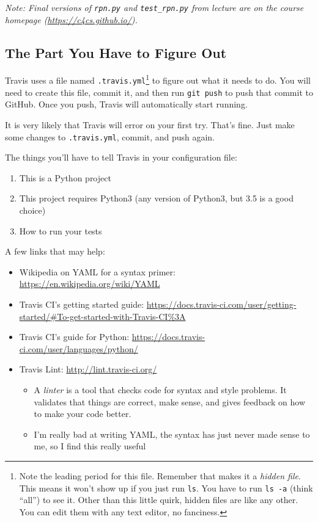 \documentclass{article}
\begin{document}
\emph{Note: Final versions of \texttt{rpn.py} and \texttt{test\_rpn.py} from
  lecture are on the course homepage (\url{https://c4cs.github.io/}).}

\newpage

\subsection{The Part You Have to Figure Out}

Travis uses a file named \texttt{.travis.yml}\footnote{%
  Note the leading period for this file. Remember that makes it a \emph{hidden
    file}. This means it won't show up if you just run \texttt{ls}. You have
  to run \texttt{ls -a} (think ``all'') to see it. Other than this little
  quirk, hidden files are like any other. You can edit them with any text
  editor, no fanciness.
} to figure out what it needs to do. You will need to create this file, commit
it, and then run \texttt{git push} to push that commit to GitHub. Once you
push, Travis will automatically start running.

It is very likely that Travis will error on your first try. That's fine. Just
make some changes to \texttt{.travis.yml}, commit, and push again.

The things you'll have to tell Travis in your configuration file:
\begin{enumerate}
  \item This is a Python project
  \item This project requires Python3 (any version of Python3, but 3.5 is a
    good choice)
  \item How to run your tests
\end{enumerate}

A few links that may help:
\begin{itemize}
  \item Wikipedia on YAML for a syntax primer: \url{https://en.wikipedia.org/wiki/YAML}
  \item Travis CI's getting started guide:
    \url{https://docs.travis-ci.com/user/getting-started/#To-get-started-with-Travis-CI\%3A}
  \item Travis CI's guide for Python:
    \url{https://docs.travis-ci.com/user/languages/python/}
  \item Travis Lint: \url{http://lint.travis-ci.org/}
    \begin{itemize}
      \item A \emph{linter} is a tool that checks code for syntax and style
        problems. It validates that things are correct, make sense, and gives
        feedback on how to make your code better.
      \item I'm really bad at writing YAML, the syntax has just never made
        sense to me, so I find this really useful
    \end{itemize}
\end{itemize}
\end{document}
